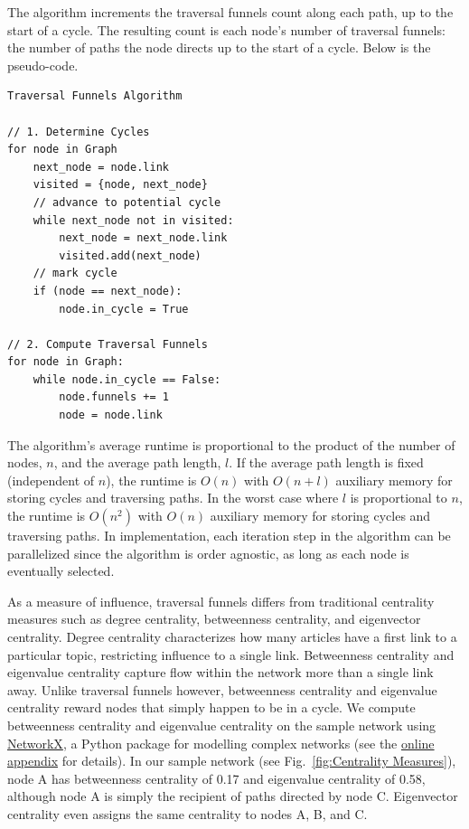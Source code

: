 \documentclass[pre,twocolumn,twoside,superscriptaddress,floatfix]{revtex4-1}
\begin{document}
{The algorithm increments the traversal funnels count along each path, up to the start of a cycle. The resulting count is each node's number of traversal funnels: the number of paths the node directs up to the start of a cycle. Below is the pseudo-code. 

\begin{verbatim}
Traversal Funnels Algorithm

// 1. Determine Cycles 
for node in Graph
    next_node = node.link
    visited = {node, next_node}
    // advance to potential cycle
    while next_node not in visited:
        next_node = next_node.link
        visited.add(next_node)
    // mark cycle
    if (node == next_node):
        node.in_cycle = True

// 2. Compute Traversal Funnels
for node in Graph:
    while node.in_cycle == False:
        node.funnels += 1
        node = node.link
\end{verbatim}

The algorithm's average runtime is proportional to the product of the number of nodes, $n$, and the average path length, $l$. If the average path length is fixed (independent of $n$), the runtime is $O(n)$ with $O(n + l)$ auxiliary memory for storing cycles and traversing paths. In the worst case where $l$ is proportional to $n$, the runtime is $O(n^2)$ with $O(n)$ auxiliary memory for storing cycles and traversing paths. In implementation, each iteration step in the algorithm can be parallelized since the algorithm is order agnostic, as long as each node is eventually selected.

As a measure of influence, traversal funnels differs from traditional centrality measures such as degree centrality, betweenness centrality, and eigenvector centrality. 
Degree centrality characterizes how many articles have a first link to a particular topic, restricting influence to a single link. 
Betweenness centrality and eigenvalue centrality capture flow within the network more than a single link away. 
Unlike traversal funnels however, betweenness centrality and eigenvalue centrality reward nodes that simply happen to be in a cycle. 
We compute betweenness centrality and eigenvalue centrality on the sample network using \href{https://networkx.github.io/}{NetworkX}, a Python package for modelling complex networks (see the \href{http://compstorylab.org/share/papers/ibrahim2016a/index.html}{online appendix} for details). 
In our sample network (see Fig.~\ref{fig:Centrality Measures}), node A has betweenness centrality of 0.17 and eigenvalue centrality of 0.58, although node A is simply the recipient of paths directed by node C.
Eigenvector centrality even assigns the same centrality to nodes A, B, and C. 

}
\end{document}
